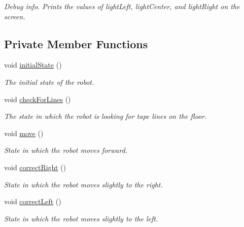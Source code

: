 \begin{DoxyCompactItemize}
\begin{DoxyCompactList}\small\item\em Debug info. Prints the values of lightLeft, lightCenter, and lightRight on the screen. \item\end{DoxyCompactList}\end{DoxyCompactItemize}
\subsection*{Private Member Functions}
\begin{DoxyCompactItemize}
\item 
void \hyperlink{class_r_j_f_r_c2011_1_1_autonomous_a1f04427d07d9569a9f746445c82b8173}{initialState} ()
\begin{DoxyCompactList}\small\item\em The initial state of the robot. \item\end{DoxyCompactList}\item 
void \hyperlink{class_r_j_f_r_c2011_1_1_autonomous_a19885a005434b857e127132a8b871cbe}{checkForLines} ()
\begin{DoxyCompactList}\small\item\em The state in which the robot is looking for tape lines on the floor. \item\end{DoxyCompactList}\item 
void \hyperlink{class_r_j_f_r_c2011_1_1_autonomous_aa3128360e2ac480a3e3ed89e2aeda31b}{move} ()
\begin{DoxyCompactList}\small\item\em State in which the robot moves forward. \item\end{DoxyCompactList}\item 
void \hyperlink{class_r_j_f_r_c2011_1_1_autonomous_acf0141adb70da7e5fe52c5597c0ad34f}{correctRight} ()
\begin{DoxyCompactList}\small\item\em State in which the robot moves slightly to the right. \item\end{DoxyCompactList}\item 
void \hyperlink{class_r_j_f_r_c2011_1_1_autonomous_a04da5791b6204403806e04d6a02ad48f}{correctLeft} ()
\begin{DoxyCompactList}\small\item\em State in which the robot moves slightly to the left. \item\end{DoxyCompactList}\item 

\end{DoxyCompactItemize}
